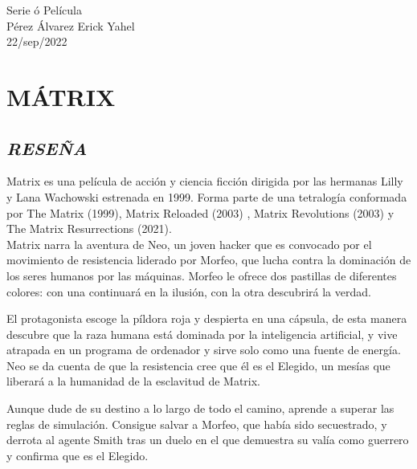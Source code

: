 \documentclass[A5paper 11pt]{article}
\begin{document}
{\centering\huge{{Serie ó Película}\\
Pérez Álvarez Erick Yahel\\
22/sep/2022}\\}


\section{MÁTRIX}

\subsection{\textit{RESEÑA}}
Matrix es una película de acción y ciencia ficción dirigida por las hermanas Lilly y Lana Wachowski estrenada en 1999. Forma parte de una tetralogía conformada por The Matrix (1999), Matrix Reloaded (2003) , Matrix Revolutions (2003) y The Matrix Resurrections (2021).\\
    
Matrix narra la aventura de Neo, un joven hacker que es convocado por el movimiento de resistencia liderado por Morfeo, que lucha contra la dominación de los seres humanos por las máquinas. Morfeo le ofrece dos pastillas de diferentes colores: con una continuará en la ilusión, con la otra descubrirá la verdad.

El protagonista escoge la píldora roja y despierta en una cápsula, de esta manera descubre que la raza humana está dominada por la inteligencia artificial, y vive atrapada en un programa de ordenador y sirve solo como una fuente de energía. Neo se da cuenta de que la resistencia cree que él es el Elegido, un mesías que liberará a la humanidad de la esclavitud de Matrix.

Aunque dude de su destino a lo largo de todo el camino, aprende a superar las reglas de simulación. Consigue salvar a Morfeo, que había sido secuestrado, y derrota al agente Smith tras un duelo en el que demuestra su valía como guerrero y confirma que es el Elegido.
\newpage
\end{document}
